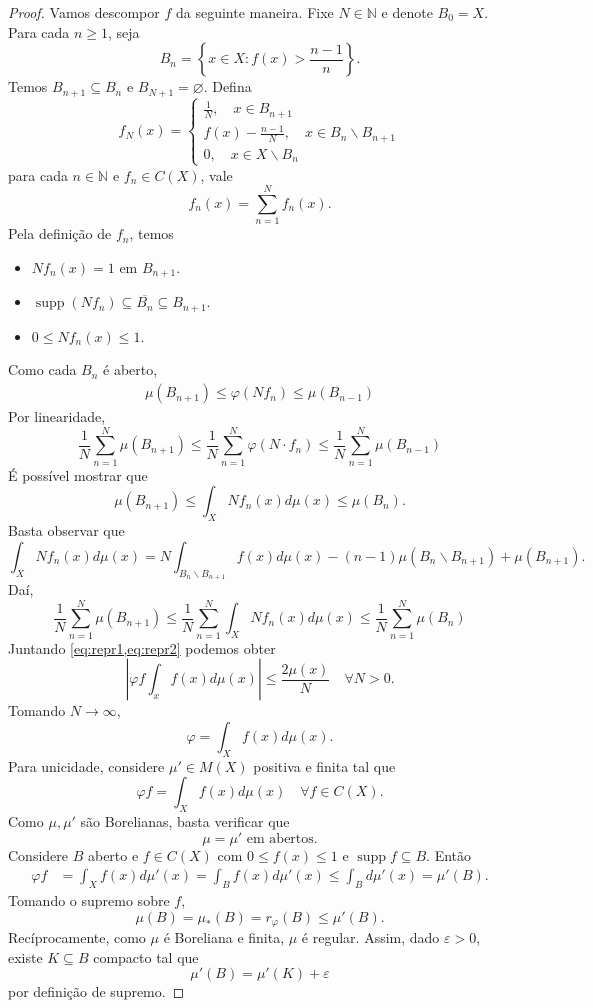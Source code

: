 \documentclass[portuguese]{article}
\theoremstyle{definition}
\newcommand{\N}{\mathbb{N}}
\begin{document}
\begin{proof}
	Vamos descompor $f$ da seguinte maneira. Fixe $N\in\N$ e denote $B_0=X$. Para cada $n\geq1$, seja
	\[B_n=\left\{x\in X:f(x)>\frac{n-1}{n}\right\}.\]
	Temos $B_{n+1}\subseteq B_n$ e $B_{N+1}=\varnothing$. Defina
	\[f_N(x)=\begin{cases}
		\frac{1}{N},\quad x\in B_{n+1}\\
		f(x)-\frac{n-1}{N},\quad x\in B_n\backslash B_{n+1}\\
		0,\quad x\in X\backslash B_n
	\end{cases}\]
	para cada $n\in\N$ e $f_n\in C(X)$, vale
	\[f_n(x)=\sum_{n=1}^Nf_n(x).\]
	Pela definição de $f_n$, temos
	\begin{itemize}
		\item $Nf_n(x)=1$ em $B_{n+1}$.
		\item $\operatorname{supp}(Nf_n)\subseteq\overline{B_n}\subseteq B_{n+1}$.
		\item $0\leq Nf_n(x)\leq1$.
	\end{itemize}
	Como cada $B_n$ é aberto,
	\begin{align*}
		\mu(B_{n+1})\leq\varphi(Nf_n)\leq\mu(B_{n-1})
	\end{align*}
	Por linearidade,
	\begin{equation}\label{eq:repr1}
		\frac{1}{N}\sum_{n=1}^N\mu(B_{n+1})\leq\frac{1}{N}\sum_{n=1}^N\varphi(N\cdot f_n)\leq\frac{1}{N}\sum_{n=1}^N\mu(B_{n-1})
	\end{equation}
	É possível mostrar que
	\[\mu(B_{n+1})\leq \int_XNf_n(x)d\mu(x)\leq\mu(B_n).\]
	Basta observar que
	\[\int_XNf_n(x)d\mu(x)=N\int_{B_n\backslash B_{n+1}}f(x)d\mu(x)-(n-1)\mu(B_n\backslash B_{n+1})+\mu(B_{n+1}).\]
	Daí,
	\begin{equation}\label{eq:repr2}
		\frac{1}{N}\sum_{n=1}^N\mu(B_{n+1})\leq\frac{1}{N}\sum_{n=1}^N\int_XNf_n(x)d\mu(x)\leq\frac{1}{N}\sum_{n=1}^N\mu(B_n)
	\end{equation}
	Juntando \cref{eq:repr1,eq:repr2} podemos obter
	\[\left|\varphi f\int_xf(x)d\mu(x)\right|\leq\frac{2\mu(x)}{N}\quad\forall N>0.\]
	Tomando $N\to\infty$,
	\[\varphi=\int_Xf(x)d\mu(x).\]
	Para unicidade, considere $\mu'\in M(X)$ positiva e finita tal que
	\[\varphi f=\int_Xf(x)d\mu(x)\quad\forall f\in C(X).\]
	Como $\mu,\mu'$ são Borelianas, basta verificar que
	\[\mu=\mu'\text{ em abertos.}\]
	Considere $B$ aberto e $f\in C(X)$ com $0\leq f(x)\leq1$ e $\operatorname{supp}f\subseteq B$. Então
	\begin{align*}
		\varphi f&=\int_Xf(x)d\mu'(x)=\int_Bf(x)d\mu'(x)\leq\int_Bd\mu'(x)=\mu'(B).
	\end{align*}
	Tomando o supremo sobre $f$,
	\[\mu(B)=\mu_*(B)=r_\varphi(B)\leq\mu'(B).\]
	Recíprocamente, como $\mu$ é Boreliana e finita, $\mu$ é regular. Assim, dado $\varepsilon>0$, existe $K\subseteq B$ compacto tal que
	\[\mu'(B)=\mu'(K)+\varepsilon\]
	por definição de supremo.
	

\end{proof}
\end{document}
